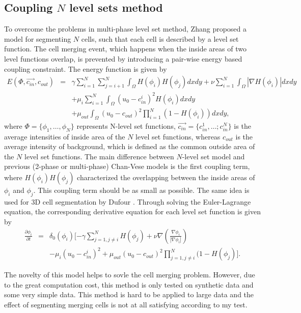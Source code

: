 \subsection{Coupling $N$ level sets method}
To overcome the problems in multi-phase level set method, Zhang \cite{zhang2004tracking} proposed a model for segmenting $N$ cells, such that each cell is described by a level set function. The cell merging event, which happens when the inside areas of two level functions overlap, is prevented by introducing a pair-wise energy based coupling constraint. The energy function is given by
\begin{eqnarray}
\nonumber
E(\Phi, \vec{c_{in}}, c_{out}) & = & \gamma \sum_{i=1}^N\sum_{j=i+1}^N\int_\Omega H(\phi_i)H(\phi_j)dxdy + \nu \sum_{i=1}^N\int_\Omega |\nabla H(\phi_i)|dxdy\\
& & + \mu_i\sum_{i=1}^N\int_\Omega (u_0 - c_{in}^i)^2H(\phi_i)dxdy \\
\nonumber
& & + \mu_{out}\int_\Omega(u_0 - c_{out})^2 \prod_{i=1}^N(1-H(\phi_i))dxdy,
\end{eqnarray}
where $\Phi = \{\phi_1,\ldots,\phi_N\}$ represents N-level set functions, $\vec{c_{in}} = \{c_{in}^1, \ldots; c_{in}^N\}$ is the average intensities of inside area of the $N$ level set functions, whereas $c_{out}$ is the average intensity of background, which is defined as the common outside area of the $N$ level set functions. The main difference between $N$-level set model and previous (2-phase or multi-phase) Chan-Vese models is the first coupling term, where $H(\phi_i)H(\phi_j)$ characterized the overlapping between the inside areas of $\phi_i$ and $\phi_j$. This coupling term should be as small as possible. The same idea is used for 3D cell segmentation by Dufour \cite{dufour2005segmenting}. Through solving the Euler-Lagrange equation, the corresponding derivative equation for each level set function is given by
\begin{eqnarray}
\frac{\partial \phi_i}{\partial t} & = & \delta_0(\phi_i)[-\gamma\sum_{j=1, j\ne i}^NH(\phi_j) + \nu\nabla(\frac{\nabla\phi_i}{|\nabla\phi_i|}) \\
& & - \mu_i(u_0 - c_{in}^i)^2 + \mu_{out}(u_0 - c_{out})^2\prod_{j=1, j\ne i}^N(1-H(\phi_j)].
\end{eqnarray}

The novelty of this model helps to sovle the cell merging problem. However, due to the great computation cost, this method is only tested on synthetic data and some very simple data. This method is hard to be applied to large data and the effect of segmenting merging cells is not at all satisfying according to my test.

